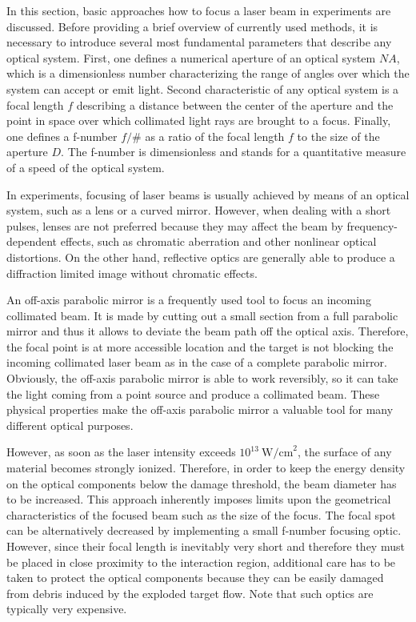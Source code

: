 In this section, basic approaches how to focus a laser beam in experiments are discussed. Before providing a brief overview of currently used methods, it is necessary to introduce several most fundamental parameters that describe any optical system. First, one defines a numerical aperture of an optical system $ N\!A $, which is a dimensionless number characterizing the range of angles over which the system can accept or emit light. Second characteristic of any optical system is a focal length $ f $ describing a distance between the center of the aperture and the point in space over which collimated light rays are brought to a focus. Finally, one defines a f-number $ f/\# $ as a ratio of the focal length $ f $ to the size of the aperture $ D $. The f-number is dimensionless and stands for a quantitative measure of a speed of the optical system.

In experiments, focusing of laser beams is usually achieved by means of an optical system, such as a lens or a curved mirror. However, when dealing with a short pulses, lenses are not preferred because they may affect the beam by frequency-dependent effects, such as chromatic aberration and other nonlinear optical distortions. On the other hand, reflective optics are generally able to produce a diffraction limited image without chromatic effects.

An off-axis parabolic mirror is a frequently used tool to focus an incoming collimated beam. It is made by cutting out a small section from a full parabolic mirror and thus it allows to deviate the beam path off the optical axis. Therefore, the focal point is at more accessible location and the target is not blocking the incoming collimated laser beam as in the case of a complete parabolic mirror. Obviously, the off-axis parabolic mirror is able to work reversibly, so it can take the light coming from a point source and produce a collimated beam. These physical properties make the off-axis parabolic mirror a valuable tool for many different optical purposes.

However, as soon as the laser intensity exceeds $ 10^{13} \ \mathrm{W/cm}^{2} $, the surface of any material becomes strongly ionized. Therefore, in order to keep the energy density on the optical components below the damage threshold, the beam diameter has to be increased. This approach inherently imposes limits upon the geometrical characteristics of the focused beam such as the size of the focus. The focal spot can be alternatively decreased by implementing a small f-number focusing optic. However, since their focal length is inevitably very short and therefore they must be placed in close proximity to the interaction region, additional care has to be taken to protect the optical components because they can be easily damaged from debris induced by the exploded target flow. Note that such optics are typically very expensive.

